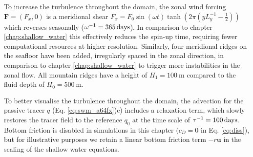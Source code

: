 To increase the turbulence throughout the domain, the zonal wind forcing $\mathbf{F} = (F_x,0)$ is a meridional shear
$F_x = F_0\sin(\omega t) \tanh(2\pi(yL_y^{-1} - \tfrac{1}{2}))$ which reverses seasonally ($\omega^{-1} = 365\operatorname{days}$). 
In comparison to chapter \ref{chap:shallow_water} this effectively reduces the spin-up time, requiring fewer computational
resources at higher resolution. Similarly, four meridional ridges on the seafloor have been added, irregularly spaced in the zonal direction,
in comparison to chapter \ref{chap:shallow_water} to trigger more instabilities in the zonal flow. All mountain ridges have
a height of $H_1 = 100~\mathrm{m}$ compared to the fluid depth of $H_0 = 500~\mathrm{m}$.

To better visualise the turbulence throughout the domain, the advection for the passive tracer $q$ (Eq. \ref{eq:swm_a64fx})c)
includes a relaxation term, which slowly restores the tracer field to the reference $q_0$ at the time scale of $\tau^{-1} = 100\operatorname{days}$.
Bottom friction is disabled in simulations in this chapter ($c_D = 0$ in Eq. \ref{eq:diss}), but for illustrative purposes we retain
a linear bottom friction term $-r\mathbf{u}$ in the scaling of the shallow water equations. 

